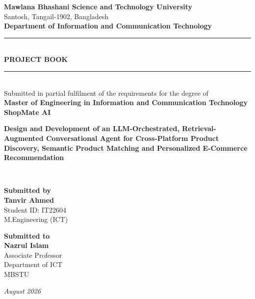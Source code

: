 \documentclass[12pt,a4paper]{report}
\begin{document}
\begin{titlepage}
\centering
\vspace*{0.4cm}
{\bfseries\fontsize{15}{18}\selectfont\color{branddark} Mawlana Bhashani Science and Technology University}\\[4pt]
{\small Santosh, Tangail-1902, Bangladesh}\\[6pt]
{\bfseries\fontsize{12.5}{15}\selectfont Department of Information and Communication Technology}\\[30pt]

{\color{brandprimary}\rule{0.82\textwidth}{1pt}}\\[9pt]
{\bfseries\fontsize{17}{20}\selectfont\color{branddark} PROJECT BOOK}\\[9pt]
{\color{brandprimary}\rule{0.82\textwidth}{1pt}}\\[26pt]

{\small Submitted in partial fulfilment of the requirements for the degree of}\\[4pt]
{\bfseries\fontsize{12.5}{15}\selectfont Master of Engineering in Information and Communication Technology}\\[36pt]

{\bfseries\fontsize{28}{32}\selectfont\color{brandprimary} ShopMate AI}\\[14pt]
\begin{minipage}{0.82\textwidth}
\centering
{\bfseries\fontsize{14}{18}\selectfont Design and Development of an LLM-Orchestrated, Retrieval-Augmented
Conversational Agent for Cross-Platform Product Discovery, Semantic Product Matching and Personalized
E-Commerce Recommendation\par}
\end{minipage}\\[40pt]

\begin{minipage}{0.42\textwidth}
\centering
\small\textbf{Submitted by}\\[6pt]
\normalsize\textbf{Tanvir Ahmed}\\
\small Student ID: IT22604\\
M.Engineering (ICT)
\end{minipage}%
\begin{minipage}{0.42\textwidth}
\centering
\small\textbf{Submitted to}\\[6pt]
\normalsize\textbf{Nazrul Islam}\\
\small Associate Professor\\
Department of ICT\\
MBSTU
\end{minipage}

\vfill
{\normalsize\itshape August 2026}
\end{titlepage}
\end{document}
